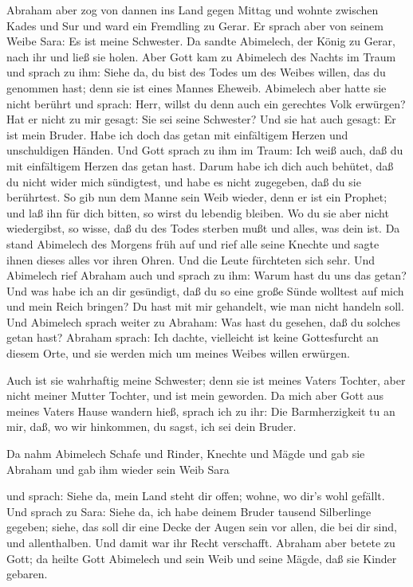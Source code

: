  Abraham aber zog von dannen ins Land gegen Mittag und
wohnte zwischen Kades und Sur und ward ein Fremdling zu Gerar.
 Er sprach aber von seinem Weibe Sara: Es ist meine
Schwester. Da sandte Abimelech, der König zu Gerar, nach ihr und ließ
sie holen.  Aber Gott kam zu Abimelech des Nachts im Traum
und sprach zu ihm: Siehe da, du bist des Todes um des Weibes willen, das
du genommen hast; denn sie ist eines Mannes Eheweib. 
Abimelech aber hatte sie nicht berührt und sprach: Herr, willst du denn
auch ein gerechtes Volk erwürgen?  Hat er nicht zu mir
gesagt: Sie sei seine Schwester? Und sie hat auch gesagt: Er ist mein
Bruder. Habe ich doch das getan mit einfältigem Herzen und unschuldigen
Händen.  Und Gott sprach zu ihm im Traum: Ich weiß auch, daß
du mit einfältigem Herzen das getan hast. Darum habe ich dich auch
behütet, daß du nicht wider mich sündigtest, und habe es nicht
zugegeben, daß du sie berührtest.  So gib nun dem Manne sein
Weib wieder, denn er ist ein Prophet; und laß ihn für dich bitten, so
wirst du lebendig bleiben. Wo du sie aber nicht wiedergibst, so wisse,
daß du des Todes sterben mußt und alles, was dein ist.  Da
stand Abimelech des Morgens früh auf und rief alle seine Knechte und
sagte ihnen dieses alles vor ihren Ohren. Und die Leute fürchteten sich
sehr.  Und Abimelech rief Abraham auch und sprach zu ihm:
Warum hast du uns das getan? Und was habe ich an dir gesündigt, daß du
so eine große Sünde wolltest auf mich und mein Reich bringen? Du hast
mit mir gehandelt, wie man nicht handeln soll.  Und
Abimelech sprach weiter zu Abraham: Was hast du gesehen, daß du solches
getan hast?  Abraham sprach: Ich dachte, vielleicht ist
keine Gottesfurcht an diesem Orte, und sie werden mich um meines Weibes
willen erwürgen.

 Auch ist sie wahrhaftig meine Schwester; denn sie ist
meines Vaters Tochter, aber nicht meiner Mutter Tochter, und ist mein
geworden.  Da mich aber Gott aus meines Vaters Hause
wandern hieß, sprach ich zu ihr: Die Barmherzigkeit tu an mir, daß, wo
wir hinkommen, du sagst, ich sei dein Bruder.

 Da nahm Abimelech Schafe und Rinder, Knechte und Mägde und
gab sie Abraham und gab ihm wieder sein Weib Sara

 und sprach: Siehe da, mein Land steht dir offen; wohne, wo
dir's wohl gefällt.  Und sprach zu Sara: Siehe da, ich habe
deinem Bruder tausend Silberlinge gegeben; siehe, das soll dir eine
Decke der Augen sein vor allen, die bei dir sind, und allenthalben. Und
damit war ihr Recht verschafft.  Abraham aber betete zu
Gott; da heilte Gott Abimelech und sein Weib und seine Mägde, daß sie
Kinder gebaren.


